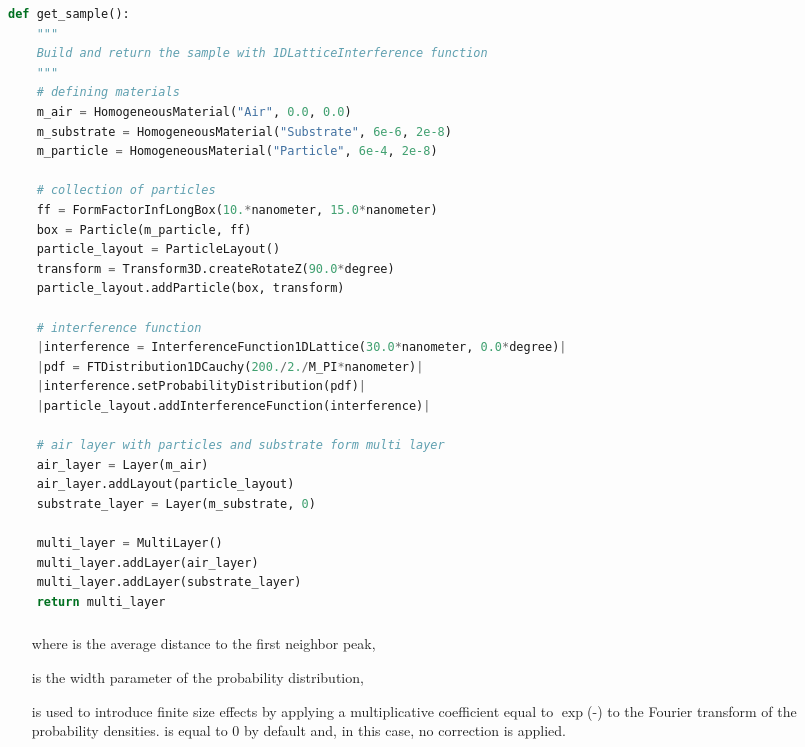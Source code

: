 \newpage
\begin{lstlisting}[language=python, style=eclipseboxed,numbers=none,nolol,caption={\Code{Python} script to generate a sample made of infinitely long boxes deposited on a substrate layer with the 1DLatticeInterference function. The part specific to the interferences is marked in a red italic font.},label={lst:1dlattinterf}]
def get_sample():
    """
    Build and return the sample with 1DLatticeInterference function
    """
    # defining materials
    m_air = HomogeneousMaterial("Air", 0.0, 0.0)
    m_substrate = HomogeneousMaterial("Substrate", 6e-6, 2e-8)
    m_particle = HomogeneousMaterial("Particle", 6e-4, 2e-8)

    # collection of particles
    ff = FormFactorInfLongBox(10.*nanometer, 15.0*nanometer)
    box = Particle(m_particle, ff)
    particle_layout = ParticleLayout()
    transform = Transform3D.createRotateZ(90.0*degree)
    particle_layout.addParticle(box, transform)

    # interference function
    |interference = InterferenceFunction1DLattice(30.0*nanometer, 0.0*degree)|
    |pdf = FTDistribution1DCauchy(200./2./M_PI*nanometer)|
    |interference.setProbabilityDistribution(pdf)|
    |particle_layout.addInterferenceFunction(interference)|

    # air layer with particles and substrate form multi layer
    air_layer = Layer(m_air)
    air_layer.addLayout(particle_layout)
    substrate_layer = Layer(m_substrate, 0)

    multi_layer = MultiLayer()
    multi_layer.addLayer(air_layer)
    multi_layer.addLayer(substrate_layer)
    return multi_layer
\end{lstlisting} 

\newpage
\subsubsection{ }  
\begin{itemize}
\item[where]  is the average distance to the first neighbor peak, 
\item[] is the width parameter of the probability distribution,
\item[]  is used to introduce finite size effects by applying a multiplicative coefficient equal to  $\exp$(-) to the Fourier transform of the probability densities.  is equal to 0 by default and, in this case, no correction is applied.
\end{itemize}

